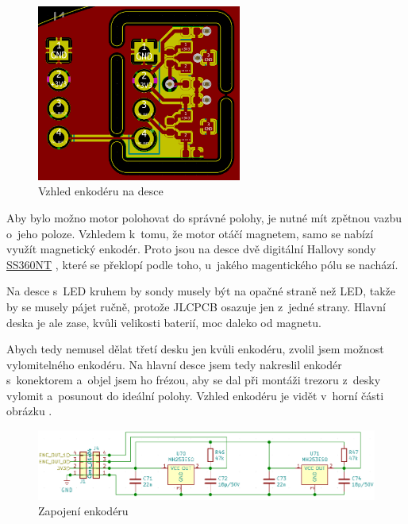 \begin{figure}
    \centering
    \includegraphics[width= 0.6\textwidth]{kapitoly/obrazky/E4/ir_motor_enkoder/pcb-enc.png}
    \caption{\label{fig:E4-enkoder_pcb}Vzhled enkodéru na desce}
\end{figure}
Aby bylo možno motor polohovat do správné polohy, je nutné mít zpětnou vazbu o~jeho poloze. Vzhledem k~tomu, že motor otáčí magnetem, samo se nabízí využít magnetický enkodér. 
Proto jsou na desce dvě digitální Hallovy sondy \href{https://datasheet.lcsc.com/szlcsc/Honeywell-SS360ST_C111924.pdf}{SS360NT} \parencite{ss360nt}, které se překlopí podle toho, 
u~jakého magentického pólu se nachází. 

Na desce s~LED kruhem by sondy musely být na opačné straně než LED, takže by se musely pájet ručně, protože JLCPCB osazuje jen z~je\-dné strany. Hlavní deska je ale zase, 
kvůli velikosti baterií, moc daleko od magnetu. 

Abych tedy nemusel dělat třetí desku jen kvůli enkodéru, zvolil jsem možnost vylomitelného enkodéru. Na hlavní desce jsem tedy nakreslil 
enkodér s~konektorem a~objel jsem ho frézou, aby se dal při montáži trezoru z~desky vylomit a~posunout do ideální polohy.
Vzhled enkodéru je vidět v~horní části obrázku .

\begin{figure}[h]
    \centering
    \includegraphics[width=\textwidth]{kapitoly/obrazky/E4/ir_motor_enkoder/enc.png}
    \caption{Zapojení enkodéru}
    \label{fig:E4-enkoder}
\end{figure}
